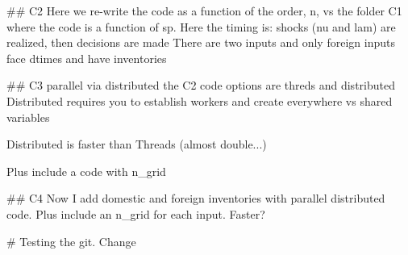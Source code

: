 
##
C2
Here we re-write the code as a function of the order, n, vs the folder C1 where the code is a function of sp.
Here the timing is: shocks (nu and lam) are realized, then decisions are made
There are two inputs and only foreign inputs face dtimes and have inventories


##
C3
parallel via distributed the C2 code
 options are threds and distributed
 Distributed requires you to establish workers and create everywhere vs shared variables

 Distributed is faster than Threads (almost double...)

 Plus include a code with n_grid 

##
C4
Now I add domestic and foreign inventories with parallel distributed code.
Plus include an n_grid for each input. Faster? 



# Testing the git. Change

